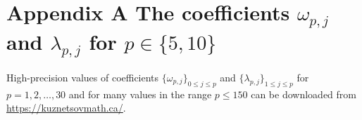\documentclass[12pt]{article}
\theoremstyle{definition}
\begin{document}


\newpage 

\appendix
\section*{Appendix A  \hspace{0.5cm} The coefficients $\omega_{p,j}$ and $\lambda_{p,j}$ for $p \in \{5,10\}$}

High-precision values of coefficients $\{\omega_{p,j}\}_{0\le j \le p}$ and $\{\lambda_{p,j}\}_{1\le j \le p}$ 
for $p=1,2,\dots,30$ and for many values in the range $p\le 150$  can be downloaded from  \url{https://kuznetsovmath.ca/}.
\end{document}
